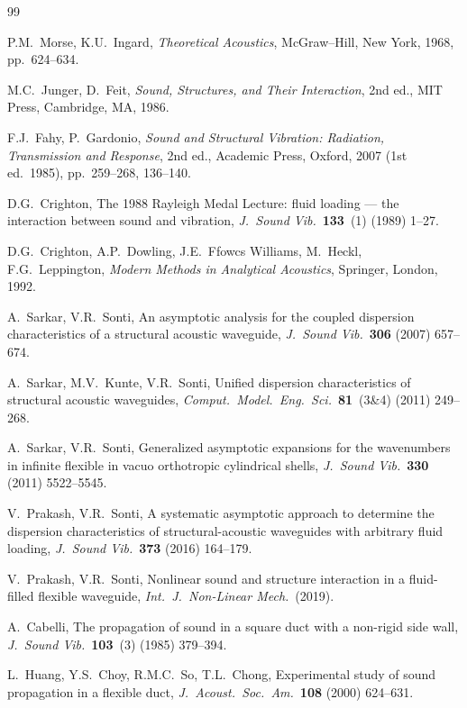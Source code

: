 \documentclass[11pt,a4paper]{article}
\theoremstyle{plain}
\theoremstyle{remark}
\begin{document}
\begin{thebibliography}{99}
\small

 P.M.\ Morse, K.U.\ Ingard, \emph{Theoretical Acoustics}, McGraw--Hill, New York,
1968, pp.\ 624--634.

 M.C.\ Junger, D.\ Feit, \emph{Sound, Structures, and Their Interaction}, 2nd ed.,
MIT Press, Cambridge, MA, 1986.

 F.J.\ Fahy, P.\ Gardonio, \emph{Sound and Structural Vibration: Radiation, Transmission
and Response}, 2nd ed., Academic Press, Oxford, 2007 (1st ed.\ 1985), pp.\ 259--268, 136--140.

 D.G.\ Crighton, The 1988 Rayleigh Medal Lecture: fluid loading --- the interaction
between sound and vibration, \emph{J.\ Sound Vib.}\ \textbf{133}~(1) (1989) 1--27.

 D.G.\ Crighton, A.P.\ Dowling, J.E.\ Ffowcs Williams, M.\ Heckl, F.G.\
Leppington, \emph{Modern Methods in Analytical Acoustics}, Springer, London, 1992.

 A.\ Sarkar, V.R.\ Sonti, An asymptotic analysis for the coupled dispersion
characteristics of a structural acoustic waveguide, \emph{J.\ Sound Vib.}\ \textbf{306} (2007)
657--674.

 A.\ Sarkar, M.V.\ Kunte, V.R.\ Sonti, Unified dispersion characteristics of
structural acoustic waveguides, \emph{Comput.\ Model.\ Eng.\ Sci.}\ \textbf{81}~(3\&4) (2011)
249--268.

 A.\ Sarkar, V.R.\ Sonti, Generalized asymptotic expansions for the
wavenumbers in infinite flexible in vacuo orthotropic cylindrical shells, \emph{J.\ Sound Vib.}\
\textbf{330} (2011) 5522--5545.

 V.\ Prakash, V.R.\ Sonti, A systematic asymptotic approach to determine the
dispersion characteristics of structural-acoustic waveguides with arbitrary fluid loading,
\emph{J.\ Sound Vib.}\ \textbf{373} (2016) 164--179.

 V.\ Prakash, V.R.\ Sonti, Nonlinear sound and structure interaction in a
fluid-filled flexible waveguide, \emph{Int.\ J.\ Non-Linear Mech.}\ (2019).

\bibitem{cabelli} A.\ Cabelli, The propagation of sound in a square duct with a non-rigid side wall,
\emph{J.\ Sound Vib.}\ \textbf{103}~(3) (1985) 379--394.

 L.\ Huang, Y.S.\ Choy, R.M.C.\ So, T.L.\ Chong, Experimental study of sound
propagation in a flexible duct, \emph{J.\ Acoust.\ Soc.\ Am.}\ \textbf{108} (2000) 624--631.


\end{thebibliography}
\end{document}

